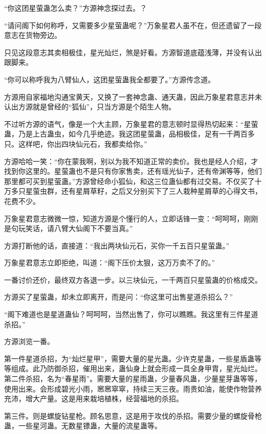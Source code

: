 
\begin{this_body}



“你这团星萤蛊怎么卖？”方源神念探过去。？

“请问阁下如何称呼，又需要多少星萤蛊呢？”万象星君人虽不在，但还遗留了一段意志在货物旁边。

只见这段意志其卖相极佳，星光灿烂，煞是好看。方源智道底蕴浅薄，并没有认出跟脚来。

“你可以称呼我为八臂仙人，这团星萤蛊我全都要了。”方源传念道。

方源用自家福地沟通宝黄天，又换了一套神念蛊、通天蛊，因此万象星君意志并未认出方源就是曾经的“狐仙”，只当方源是个陌生人物。

不过听方源的语气，像是一个大主顾，万象星君的意志顿时显得热切起来：“星萤蛊，乃是上古蛊虫，如今几乎绝迹。我这团星萤蛊，品相极佳，足有一千两百多只。这样吧，你出四块仙元石，我都卖给你。”

方源哈哈一笑：“你在蒙我啊，别以为我不知道正常的卖价。我也是经人介绍，才找到你这里的。星萤蛊也不是只有你家售卖，还有瑶光仙子，还有帝渊等等，他们那里都可买到星萤蛊。”方源曾经命小狐仙，和这三位蛊仙都有过交易。不仅买了十万多只星萤虫群，还有星屑草籽，之后又分别买下了三人栽种星屑草的心得文书，花费不少。

万象星君意志微微一惊，知道方源是个懂行的人，立即话锋一变：“呵呵呵，刚刚是句玩笑话，请八臂大仙阁下不要当真。”

方源打断他的话，直接道：“我出两块仙元石，买你一千五百只星萤蛊。”

万象星君意志立即拒绝，叫道：“阁下压价太狠，这万万卖不了的。”

一番讨价还价，最终双方各退一步。以三块仙元，一千两百只星萤蛊的价格成交。

方源买了星萤蛊，却未立即离开，而是问：“你这里可出售星道杀招么？”

“阁下难道也是星道蛊仙？呵呵呵，当然出售了，你可以瞧瞧。我这里有三件星道杀招。”

方源浏览一番。

第一件星道杀招，为“灿烂星甲”，需要大量的星光蛊。少许克星蛊，一些星盾蛊等等组成。此乃防御杀招，催用出来，蛊仙身上就会形成一具全身甲胄，星光灿烂。第二件杀招，名为“春星雨”。需要大量的星雨蛊，少量春风蛊，少量星芽蛊等等，使用出来。会形成碧光小雨，窸窸窣窣，持续三天三夜。雨贵如油，能使作物营养充沛，增大产量。这是用来栽培植株，经营福地的杀招。

第三件。则是螺旋钻星枪。顾名思意，这是用于攻伐的杀招。需要少量的螺旋骨枪蛊，一些星河蛊。无数星镖蛊，大量的流星蛊等。


\end{this_body}
